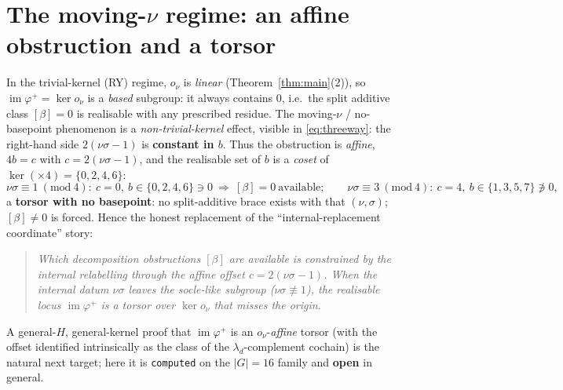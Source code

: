 \documentclass[11pt]{article}
\theoremstyle{definition}
\newcommand{\im}{\operatorname{im}}
\begin{document}
\section{The moving-$\nu$ regime: an affine obstruction and a torsor}\label{sec:torsor}

In the trivial-kernel (RY) regime, $o_\nu$ is \emph{linear} (Theorem~\ref{thm:main}(2)), so
$\im\varphi^+=\ker o_\nu$ is a \emph{based} subgroup: it always contains $0$, i.e.\ the
split additive class $[\beta]=0$ is realisable with any prescribed residue. The
moving-$\nu$ / no-basepoint phenomenon is a \emph{non-trivial-kernel} effect, visible in
\eqref{eq:threeway}: the right-hand side $2(\nu\sigma-1)$ is \textbf{constant in $b$}. Thus
the obstruction is \emph{affine}, $4b=c$ with $c=2(\nu\sigma-1)$, and the realisable set of
$b$ is a \emph{coset} of $\ker(\times4)=\{0,2,4,6\}$:
\[
\nu\sigma\equiv1\ (\mathrm{mod}\ 4):\ c=0,\ b\in\{0,2,4,6\}\ni0\ \Rightarrow\ [\beta]=0\ \text{available};\qquad
\nu\sigma\equiv3\ (\mathrm{mod}\ 4):\ c=4,\ b\in\{1,3,5,7\}\not\ni0,
\]
a \textbf{torsor with no basepoint}: no split-additive brace exists with that
$(\nu,\sigma)$; $[\beta]\neq0$ is forced. Hence the honest replacement of the
``internal-replacement coordinate'' story:

\begin{quote}\itshape
Which decomposition obstructions $[\beta]$ are \emph{available} is constrained by the
internal relabelling through the affine offset $c=2(\nu\sigma-1)$. When the internal datum
$\nu\sigma$ leaves the socle-like subgroup ($\nu\sigma\not\equiv1$), the realisable locus
$\im\varphi^+$ is a torsor over $\ker o_\nu$ that misses the origin.
\end{quote}

\noindent A general-$H$, general-kernel proof that $\im\varphi^+$ is an
$o_\nu$-\emph{affine} torsor (with the offset identified intrinsically as the class of the
$\lambda_d$-complement cochain) is the natural next target; here it is \texttt{computed} on
the $|G|=16$ family and \textbf{open} in general.
\end{document}
